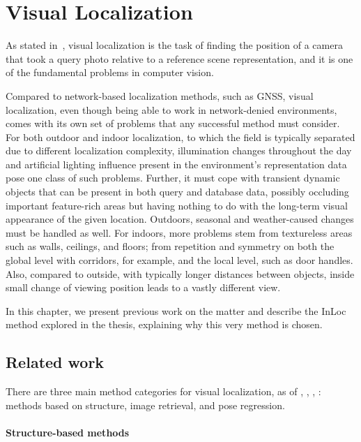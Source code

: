 \chapter{Visual Localization} \label{chap:visual_loc}

As stated in~, visual localization is the task of finding
the position of a camera that took a query photo relative to a reference scene
representation, and it is one of the fundamental problems in computer vision.

Compared to network-based localization methods, such as GNSS, visual localization,
even though being able to work in network-denied environments, comes with its own
set of problems that any successful method must consider. For both outdoor and
indoor localization, to which the field is typically separated due to different
localization complexity, illumination changes throughout the day and artificial lighting
influence present in the environment's representation data pose one class of such problems.
Further, it must cope with transient dynamic objects that can be present in both query
and database data, possibly occluding important feature-rich areas but having nothing
to do with the long-term visual appearance of the given location. Outdoors, seasonal and
weather-caused changes must be handled as well. For indoors, more problems stem from
textureless areas such as walls, ceilings, and floors; from repetition and symmetry
on both the global level with corridors, for example, and the local level, such as door handles.
Also, compared to outside, with typically longer distances between objects, inside small change
of viewing position leads to a vastly different view.

In this chapter, we present previous work on the matter and describe the InLoc method
explored in the thesis, explaining why this very method is chosen.

\section{Related work}

There are three main method categories for visual localization, as of \citet{torsten2018},
\citet{torsten2019}, \citet{torsten2021}, \citet{naverlabs}: methods based on structure,
image retrieval, and pose regression.

\subsubsection*{Structure-based methods}

